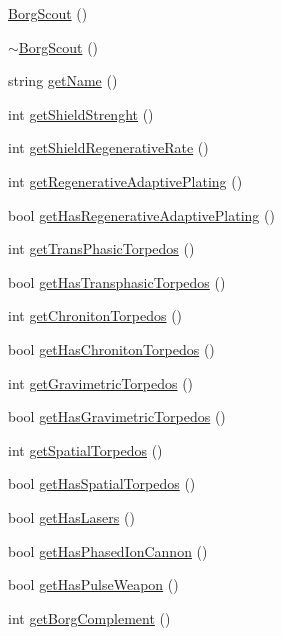 \begin{DoxyCompactItemize}
\item 
\hyperlink{classBorgScout_a4867f3f56ad3f67850e66d89682318a1}{BorgScout} ()
\item 
\hyperlink{classBorgScout_a40f473098c9948cc5bc8df98c1ad58d8}{$\sim$BorgScout} ()
\item 
string \hyperlink{classBorgScout_a59bfebc7126c503bb8f83a5572149e23}{getName} ()
\item 
int \hyperlink{classBorgScout_a083b7b41ca27d5b3f4fa1772f95413e3}{getShieldStrenght} ()
\item 
int \hyperlink{classBorgScout_a7fdb9eda7cced87acb05f9984742da47}{getShieldRegenerativeRate} ()
\item 
int \hyperlink{classBorgScout_af4ab31bd4edc30c887b4a36f9a0f5a62}{getRegenerativeAdaptivePlating} ()
\item 
bool \hyperlink{classBorgScout_a13a50a9d314581a10f232cee3612ce55}{getHasRegenerativeAdaptivePlating} ()
\item 
int \hyperlink{classBorgScout_a88484687d5bbe7616fd2b8f6a705eb34}{getTransPhasicTorpedos} ()
\item 
bool \hyperlink{classBorgScout_a3504b9ab7146069cdda109582f177329}{getHasTransphasicTorpedos} ()
\item 
int \hyperlink{classBorgScout_af4946e931ed104ab99739fb33ca15303}{getChronitonTorpedos} ()
\item 
bool \hyperlink{classBorgScout_a2fe05bd1706ab0f55a8bb3075ab97ca0}{getHasChronitonTorpedos} ()
\item 
int \hyperlink{classBorgScout_a5b025086c5d5f8175df3f9e581a1948e}{getGravimetricTorpedos} ()
\item 
bool \hyperlink{classBorgScout_af9589d7333a7f56aadcd49ebfdb63453}{getHasGravimetricTorpedos} ()
\item 
int \hyperlink{classBorgScout_a7fb32f9bc92f36e05bfb3db42b4b3d91}{getSpatialTorpedos} ()
\item 
bool \hyperlink{classBorgScout_aed0c2eadce9f7ecc0278ccbd139fc795}{getHasSpatialTorpedos} ()
\item 
bool \hyperlink{classBorgScout_a685ff7acbc0f6987cb62a617853f96f7}{getHasLasers} ()
\item 
bool \hyperlink{classBorgScout_a1ee127e8654d327c6ee34b5077c8ea1d}{getHasPhasedIonCannon} ()
\item 
bool \hyperlink{classBorgScout_a4a2dda4639a9f5f53d673cf82d7ff416}{getHasPulseWeapon} ()
\item 
int \hyperlink{classBorgScout_af60afb5ab8fa330ab09a841fe3cc0ae6}{getBorgComplement} ()

\end{DoxyCompactItemize}

